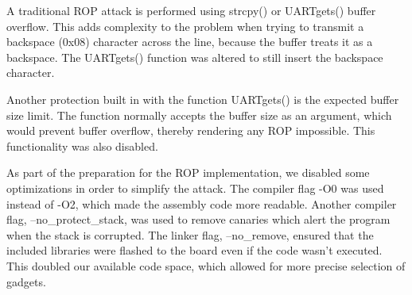 A traditional ROP attack is performed using strcpy() or UARTgets() buffer overflow. This adds complexity to the problem when trying to transmit a backspace (0x08) character across the line, because the buffer treats it as a backspace. The UARTgets() function was altered to still insert the backspace character. 

Another protection built in with the function UARTgets() is the expected buffer size limit. The function normally accepts the buffer size as an argument, which would prevent buffer overflow, thereby rendering any ROP impossible. This functionality was also disabled. 

As part of the preparation for the ROP implementation, we disabled some  optimizations in order to simplify the attack. The compiler flag -O0 was used instead of -O2, which made the assembly code more readable. Another compiler flag, --no\_protect\_stack, was used to remove canaries which alert the program when the stack is corrupted. The linker flag, --no\_remove, ensured that the included libraries were flashed to the board even if the code wasn't executed. This doubled our available code space, which allowed for more precise selection of gadgets. 